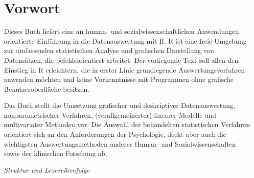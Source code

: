 \chapter*{Vorwort}

Dieses Buch liefert eine an human- und sozialwissenschaftlichen Anwendungen orientierte Einführung in die Datenauswertung mit R. R ist eine freie Umgebung zur umfassenden statistischen Analyse und grafischen Darstellung von Datensätzen, die befehlsorientiert arbeitet. Der vorliegende Text soll allen den Einstieg in R erleichtern, die in erster Linie grundlegende Auswertungsverfahren anwenden möchten und keine Vorkenntnisse mit Programmen ohne grafische Benutzeroberfläche besitzen.

Das Buch stellt die Umsetzung grafischer und deskriptiver Datenauswertung, nonparametrischer Verfahren, (verallgemeinerter) linearer Modelle und multivariater Methoden vor. Die Auswahl der behandelten statistischen Verfahren orientiert sich an den Anforderungen der Psychologie, deckt aber auch die wichtigsten Auswertungsmethoden anderer Human- und Sozialwissenschaften sowie der klinischen Forschung ab.

\textit{Struktur und Lesereihenfolge}

